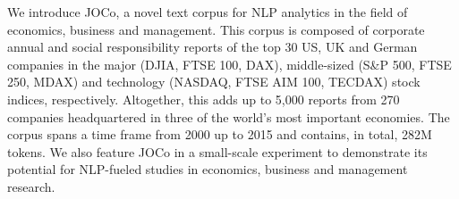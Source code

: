 We introduce JOCo, a novel text corpus for NLP analytics in the field of economics, business and management. This corpus is composed of corporate annual and social responsibility reports of the top 30 US, UK and German companies in the major (DJIA, FTSE 100, DAX), middle-sized (S\&P 500, FTSE 250, MDAX) and technology (NASDAQ, FTSE AIM 100, TECDAX) stock indices, respectively. Altogether, this adds up to 5,000 reports from 270 companies headquartered in three of the world's most important economies. The corpus spans a time frame from 2000 up to 2015 and contains, in total, 282M tokens. We also feature JOCo in a small-scale experiment to demonstrate its potential for NLP-fueled studies in economics, business and management research.
